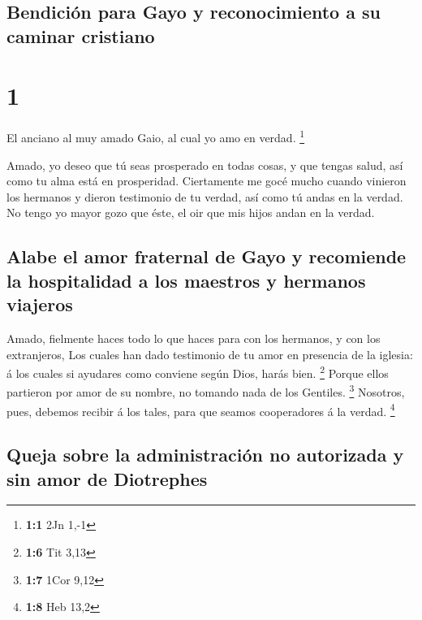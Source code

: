 \hypertarget{bendiciuxf3n-para-gayo-y-reconocimiento-a-su-caminar-cristiano}{%
\subsection{Bendición para Gayo y reconocimiento a su caminar
cristiano}\label{bendiciuxf3n-para-gayo-y-reconocimiento-a-su-caminar-cristiano}}

\hypertarget{section}{%
\section{1}\label{section}}

 El anciano al muy amado Gaio, al cual yo amo en verdad.
\footnote{\textbf{1:1} 2Jn 1,-1}

 Amado, yo deseo que tú seas prosperado en todas cosas, y
que tengas salud, así como tu alma está en prosperidad. 
Ciertamente me gocé mucho cuando vinieron los hermanos y dieron
testimonio de tu verdad, así como tú andas en la verdad. 
No tengo yo mayor gozo que éste, el oir que mis hijos andan en la
verdad.

\hypertarget{alabe-el-amor-fraternal-de-gayo-y-recomiende-la-hospitalidad-a-los-maestros-y-hermanos-viajeros}{%
\subsection{Alabe el amor fraternal de Gayo y recomiende la hospitalidad
a los maestros y hermanos
viajeros}\label{alabe-el-amor-fraternal-de-gayo-y-recomiende-la-hospitalidad-a-los-maestros-y-hermanos-viajeros}}

 Amado, fielmente haces todo lo que haces para con los
hermanos, y con los extranjeros,  Los cuales han dado
testimonio de tu amor en presencia de la iglesia: á los cuales si
ayudares como conviene según Dios, harás bien. \footnote{\textbf{1:6}
  Tit 3,13}  Porque ellos partieron por amor de su nombre,
no tomando nada de los Gentiles. \footnote{\textbf{1:7} 1Cor 9,12}
 Nosotros, pues, debemos recibir á los tales, para que
seamos cooperadores á la verdad. \footnote{\textbf{1:8} Heb 13,2}

\hypertarget{queja-sobre-la-administraciuxf3n-no-autorizada-y-sin-amor-de-diotrephes}{%
\subsection{Queja sobre la administración no autorizada y sin amor de
Diotrephes}\label{queja-sobre-la-administraciuxf3n-no-autorizada-y-sin-amor-de-diotrephes}}

